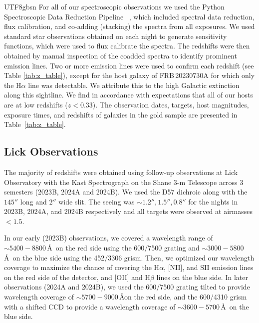 \documentclass[twocolumn,linenumbers]{aastex631}
\begin{document}
\begin{CJK*}{UTF8}{gbsn}
For all of our spectroscopic observations we used the Python Spectroscopic Data Reduction Pipeline ~\citep[PypeIt v1.16 for Gemini data and v1.15 otherwise][]{prochaska2020pypeit}, which included spectral data reduction, flux calibration, and co-adding (stacking) the spectra from all exposures. We used standard star observations obtained on each night to generate sensitivity functions, which were used to flux calibrate the spectra. The redshifts were then obtained by manual inspection of the coadded spectra to identify prominent
emission lines. Two or more emission lines were used to confirm each redshift (see Table \ref{tab:z_table}), except for the host galaxy of FRB\,20230730A for which only the H$\alpha$ line was detectable. We attribute this to the high Galactic extinction along this sightline. We find in accordance with expectations that all of our hosts are at low redshifts ($z < 0.33$). The observation dates, targets, host magnitudes, exposure times, and redshifts of galaxies in the gold sample are presented in Table~\ref{tab:z_table}. 

\subsection{Lick Observations}
The majority of redshifts were obtained using follow-up observations at Lick Observatory with the Kast Spectrograph on the Shane 3-m Telescope across 3 semesters (2023B, 2024A and 2024B). %
We used the D57 dichroic along with the $145''$ long and $2''$ wide slit. The seeing was $\sim1.2'',1.5'',0.8''$ for the nights in 2023B, 2024A, and 2024B respectively and all targets were observed at airmasses $<1.5$.

In our early (2023B) observations, we covered a wavelength range of $\sim5400 - 8800$\,\AA\ on the red side using the 600/7500 grating and $\sim3000 - 5800$\,\AA\ on the blue side using the 452/3306 grism.
Then, we optimized our wavelength coverage to maximize the chance of covering the H$\alpha$, [NII], and SII emission lines on the red side of the detector, and [OII] and H$\beta$ lines on the blue side.
In later observations (2024A and 2024B), we used the 600/7500 grating tilted to provide wavelength coverage of $\sim5700 - 9000$\,\AA on the red side, and the 600/4310 grism with a shifted CCD to provide a wavelength coverage of $\sim3600 - 5700$\,\AA\ on the blue side.


\end{CJK*}
\end{document}
